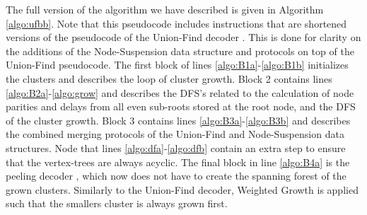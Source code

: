 The full version of the algorithm we have described is given in Algorithm \ref{algo:ufbb}. Note that this pseudocode includes instructions that are shortened versions of the pseudocode of the Union-Find decoder \cite{delfosse2017almost}. This is done for clarity on the additions of the Node-Suspension data structure and protocols on top of the Union-Find pseudocode. The first block  of lines \ref{algo:B1a}-\ref{algo:B1b} initializes the clusters and describes the loop of cluster growth. Block 2 contains lines \ref{algo:B2a}-\ref{algo:grow} and describes the DFS's related to the calculation of node parities and delays from all even sub-roots stored at the root node, and the DFS of the cluster growth. Block 3 contains lines \ref{algo:B3a}-\ref{algo:B3b} and describes the combined merging protocols of the Union-Find and Node-Suspension data structures. Node that lines \ref{algo:dfa}-\ref{algo:dfb} contain an extra step to ensure that the vertex-trees are always acyclic. The final block in line \ref{algo:B4a} is the peeling decoder \cite{delfosse2017linear}, which now does not have to create the spanning forest of the grown clusters. Similarly to the Union-Find decoder, Weighted Growth is applied such that the smallers cluster is always grown first. 
